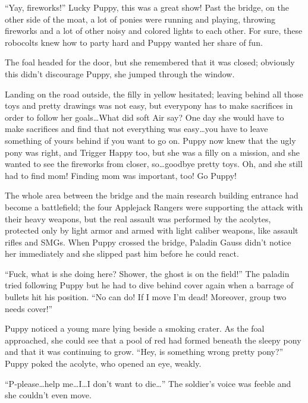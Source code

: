 ``Yay, fireworks!'' Lucky Puppy, this was a great show! Past the bridge, on the other side of the moat, a lot of ponies were running and playing, throwing fireworks and a lot of other noisy and colored lights to each other. For sure, these robocolts knew how to party hard and Puppy wanted her share of fun.

The foal headed for the door, but she remembered that it was closed; obviously this didn't discourage Puppy, she jumped through the window.

Landing on the road outside, the filly in yellow hesitated; leaving behind all those toys and pretty drawings was not easy, but everypony has to make sacrifices in order to follow her goals\dots What did soft Air say? One day she would have to make sacrifices and find that not everything was easy\dots you have to leave something of yours behind if you want to go on. Puppy now knew that the ugly pony was right, and Trigger Happy too, but she was a filly on a mission, and she wanted to see the fireworks from closer, so\dots goodbye pretty toys. Oh, and she still had to find mom! Finding mom was important, too! Go Puppy!

\horizonline


The whole area between the bridge and the main research building entrance had become a battlefield; the four Applejack Rangers were supporting the attack with their heavy weapons, but the real assault was performed by the acolytes, protected only by light armor and armed with light caliber weapons, like assault rifles and SMGs. When Puppy crossed the bridge, Paladin Gauss didn't notice her immediately and she slipped past him before he could react.

``Fuck, what is she doing here? Shower, the ghost is on the field!'' The paladin tried following Puppy but he had to dive behind cover again when a barrage of bullets hit his position. ``No can do! If I move I'm dead! Moreover, group two needs cover!''

Puppy noticed a young mare lying beside a smoking crater. As the foal approached, she could see that a pool of red had formed beneath the sleepy pony and that it was continuing to grow. ``Hey, is something wrong pretty pony?'' Puppy poked the acolyte, who opened an eye, weakly.

``P-please\dots help me\dots I\dots I don't want to die\dots'' The soldier's voice was feeble and she couldn't even move.

